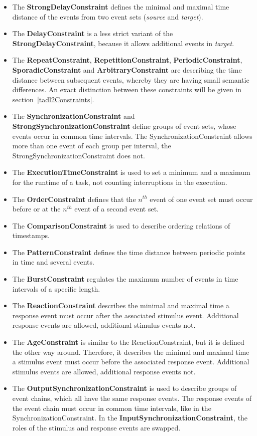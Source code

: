 	\begin{itemize}
		\item
			The \textbf{StrongDelayConstraint} defines the minimal and maximal time distance of the events from two event sets (\emph{source} and \emph{target}).
		\item
			The \textbf{DelayConstraint} is a less strict variant of the \textbf{StrongDelayConstraint}, because it allows additional events in \emph{target}.
		\item
			The \textbf{RepeatConstraint}, \textbf{RepetitionConstraint}, \textbf{PeriodicConstraint}, \textbf{SporadicConstraint} and \textbf{ArbitraryConstraint} are describing the time distance between subsequent events, whereby they are having small semantic differences. An exact distinction between these constraints will be given in section~\ref{tadl2Constraints}.
		\item
			The \textbf{SynchronizationConstraint} and \textbf{StrongSynchronizationConstraint} define groups of event sets, whose events occur in common time intervals. The SynchronizationConstraint allows more than one event of each group per interval, the StrongSynchronizationConstraint does not.
		\item
			The \textbf{ExecutionTimeConstraint} is used to set a minimum and a maximum for the runtime of a task, not counting interruptions in the execution.
		\item
			The \textbf{OrderConstraint} defines that the $n^{th}$ event of one event set must occur before or at the $n^{th}$ event of a second event set.
		\item
			The \textbf{ComparisonConstraint} is used to describe ordering relations of timestamps.
		\item
			The \textbf{PatternConstraint} defines the time distance between periodic points in time and several events.
		\item
			The \textbf{BurstConstraint} regulates the maximum number of events in time intervals of a specific length.
		\item
			The \textbf{ReactionConstraint} describes the minimal and maximal time a response event must occur after the associated stimulus event. Additional response events are allowed, additional stimulus events not.
		\item
			The \textbf{AgeConstraint} is similar to the ReactionConstraint, but it is defined the other way around. Therefore, it describes the minimal and maximal time a stimulus event must occur before the associated response event.  Additional stimulus events are allowed, additional response events not.
		\item
			The \textbf{OutputSynchronizationConstraint} is used to describe groups of event chains, which all have the same response events. The response events of the event chain must occur in common time intervals, like in the SynchronizationConstraint. In the \textbf{InputSynchronizationConstraint}, the roles of the stimulus and response events are swapped.			
	\end{itemize}
	
